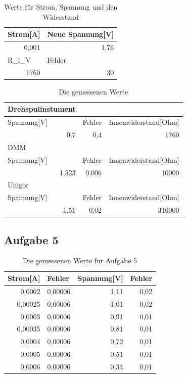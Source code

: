 \documentclass[12pt]{scrartcl}
\begin{document}
\begin{table}[htbp]
\caption{Werte für Strom, Spannung und den Widerstand}
\centering
\begin{tabular}{|l|l|}
\hline
Strom[A] & Neue Spannung[V] \\ \hline
\multicolumn{1}{|r|}{0,001} & \multicolumn{1}{r|}{1,76} \\ \hline
R\_i\_V & Fehler \\ \hline
\multicolumn{1}{|r|}{1760} & \multicolumn{1}{r|}{30} \\ \hline
\end{tabular}
\label{aufgabe_4_werte}
\end{table}

\begin{table}[htbp]
\caption{Die gemessenen Werte}
\centering
\begin{tabular}{|l|l|l|}
\hline
Drehspulinstument &  &  \\ \hline
Spannung[V] & Fehler & Innenwiderstand[Ohm] \\ \hline
\multicolumn{1}{|r|}{0,7} & \multicolumn{1}{r|}{0,4} & \multicolumn{1}{r|}{1760} \\ \hline
DMM &  &  \\ \hline
Spannung[V] & Fehler & Innenwiderstand[Ohm] \\ \hline
\multicolumn{1}{|r|}{1,523} & \multicolumn{1}{r|}{0,006} & \multicolumn{1}{r|}{10000} \\ \hline
Unigor &  &  \\ \hline
Spannung[V] & Fehler & Innenwiderstand[Ohm] \\ \hline
\multicolumn{1}{|r|}{1,51} & \multicolumn{1}{r|}{0,02} & \multicolumn{1}{r|}{316000} \\ \hline
\end{tabular}
\label{aufgabe_4_messwerte}
\end{table}

\newpage

\subsection{Aufgabe 5}

\begin{table}[htbp]
\caption{Die gemessenen Werte für Aufgabe 5}
\centering
\begin{tabular}{|r|r|r|r|}
\hline
\multicolumn{1}{|l|}{Strom[A]} & \multicolumn{1}{l|}{Fehler} & \multicolumn{1}{l|}{Spannung[V]} & \multicolumn{1}{l|}{Fehler} \\ \hline
0,0002 & 0,00006 & 1,11 & 0,02 \\ \hline
0,00025 & 0,00006 & 1,01 & 0,02 \\ \hline
0,0003 & 0,00006 & 0,91 & 0,01 \\ \hline
0,00035 & 0,00006 & 0,81 & 0,01 \\ \hline
0,0004 & 0,00006 & 0,72 & 0,01 \\ \hline
0,0005 & 0,00006 & 0,51 & 0,01 \\ \hline
0,0006 & 0,00006 & 0,34 & 0,01 \\ \hline
\end{tabular}
\label{aufgabe_5_messwerte}
\end{table}
\end{document}
